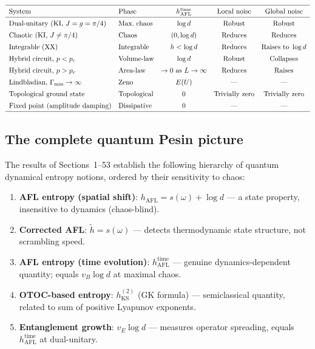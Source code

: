\documentclass[12pt,a4paper]{article}
\begin{document}
\[
\renewcommand{\arraystretch}{1.4}
\begin{array}{llccc}
\hline
\text{System} & \text{Phase} & h_{\mathrm{AFL}}^{\mathrm{time}} &
  \text{Local noise} & \text{Global noise}\\
\hline
\text{Dual-unitary (KI, }J=g=\pi/4) & \text{Max.\ chaos} & \log d & \text{Robust} & \text{Robust}\\
\text{Chaotic (KI, }J \ne \pi/4) & \text{Chaos} & (0,\log d) & \text{Reduces} & \text{Reduces}\\
\text{Integrable (XX)} & \text{Integrable} & h < \log d & \text{Reduces} & \text{Raises to }\log d\\
\text{Hybrid circuit, }p<p_c & \text{Volume-law} & \log d & \text{Robust} & \text{Collapses}\\
\text{Hybrid circuit, }p>p_c & \text{Area-law} & \to 0\text{ as }L\to\infty & \text{Reduces} & \text{Raises}\\
\text{Lindbladian, }\Gamma_{\min}\to\infty & \text{Zeno} & E(U) & \text{---} & \text{---}\\
\text{Topological ground state} & \text{Topological} & 0 & \text{Trivially zero} & \text{Trivially zero}\\
\text{Fixed point (amplitude damping)} & \text{Dissipative} & 0 & \text{---} & \text{---}\\
\hline
\end{array}
\]

\subsection{The complete quantum Pesin picture}

The results of Sections~1--53 establish the following hierarchy of
quantum dynamical entropy notions, ordered by their sensitivity to chaos:

\begin{enumerate}
\item \textbf{AFL entropy (spatial shift)}: $h_{\mathrm{AFL}} = s(\omega)+\log d$
  — a state property, insensitive to dynamics (chaos-blind).
\item \textbf{Corrected AFL}: $\tilde{h} = s(\omega)$
  — detects thermodynamic state structure, not scrambling speed.
\item \textbf{AFL entropy (time evolution)}: $h_{\mathrm{AFL}}^{\mathrm{time}}$
  — genuine dynamics-dependent quantity; equals $v_B\log d$ at maximal chaos.
\item \textbf{OTOC-based entropy}: $h_{\mathrm{KS}}^{(2)}$ (GK formula)
  — semiclassical quantity, related to sum of positive Lyapunov exponents.
\item \textbf{Entanglement growth}: $v_E\log d$
  — measures operator spreading, equals $h_{\mathrm{AFL}}^{\mathrm{time}}$
    at dual-unitary.
\end{enumerate}
\end{document}
